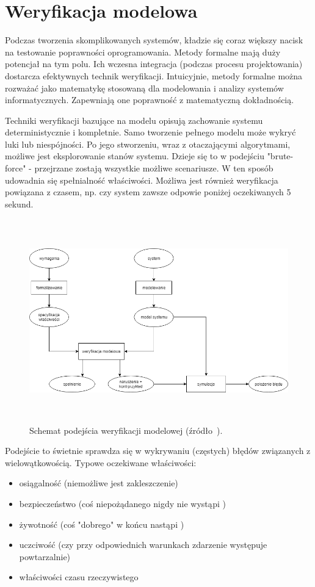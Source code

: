 \section{Weryfikacja modelowa}

Podczas tworzenia skomplikowanych systemów, kładzie się coraz większy nacisk na testowanie poprawności oprogramowania. Metody formalne mają duży potencjał na tym polu. Ich wczesna integracja (podczas procesu projektowania) dostarcza efektywnych technik weryfikacji.
Intuicyjnie, metody formalne można rozważać jako matematykę stosowaną dla modelowania i analizy systemów informatycznych. Zapewniają one poprawność z matematyczną dokładnością.

Techniki weryfikacji bazujące na modelu opisują zachowanie systemu deterministycznie i kompletnie. Samo tworzenie pełnego modelu może wykryć luki lub niespójności.
Po jego stworzeniu, wraz z otaczającymi algorytmami, możliwe jest eksplorowanie stanów systemu.
Dzieje się to w podejściu "brute-force" - przejrzane zostają wszystkie możliwe scenariusze.
W ten sposób udowadnia się spełnialność właściwości. Możliwa jest również weryfikacja powiązana z czasem, np. czy system zawsze odpowie poniżej oczekiwanych 5 sekund.

\begin{figure}[h]
    \centering
    \includegraphics[height=8.8cm,keepaspectratio]{img/model_checking_approach_schematic_view.png}
    \caption{Schemat podejścia weryfikacji modelowej (źródło~\cite{Bai08}).}
    \label{fig:model_checking_scheme}
\end{figure}

Podejście to świetnie sprawdza się w wykrywaniu (częstych) błędów związanych z wielowątkowością. Typowe oczekiwane właściwości:
\begin{itemize}
\item osiągalność (niemożliwe jest zakleszczenie)
\item bezpieczeństwo (coś niepożądanego nigdy nie wystąpi \cite{Alp87})
\item żywotność (coś "dobrego" w końcu nastąpi \cite{Alp85})
\item uczciwość (czy przy odpowiednich warunkach zdarzenie występuje powtarzalnie)
\item właściwości czasu rzeczywistego
\end{itemize}

